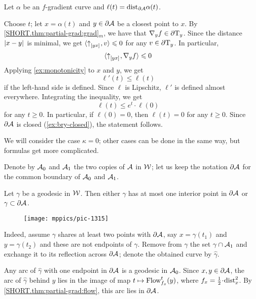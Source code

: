 Let $\alpha$ be an $f$-gradient curve and $\ell(t)=\mathrm{dist}_{\partial \mathcal{A}}\alpha(t)$.

Choose $t$;
let $x=\alpha(t)$ and $y\in \partial\mathcal{A}$ be a closest point to $x$.
By \ref{SHORT.thm:partial-grad:grad}$_m$, we have that $\nabla_y f\in\partial \mathrm{T}_y$.
Since the distance $|{x}-{y}|_{}^{{}}$ is minimal, 
we get $\langle {\uparrow}_{[{y}{x}]_{{}}},v\rangle\leqslant 0$ for any $v\in \partial \mathrm{T}_y$.
In particular,
\[\langle {\uparrow}_{[{y}{x}]_{{}}},\nabla_y f\rangle\leqslant 0\]
Applying \ref{ex:monotonicity} to $x$ and $y$,
we get
\[\ell'(t)\le \ell(t)\]
if the left-hand side is defined.
Since $\ell$ is Lipschitz, $\ell'$ is defined almost everywhere.
Integrating the inequality, we get 
\[\ell(t)\le e^t\cdot\ell(0)\]
for any $t\ge 0$.
In particular, if $\ell(0)=0$, then $\ell(t)=0$ for any $t\ge 0$.
Since $\partial\mathcal{A}$ is closed (\ref{ex:bry-closed}), the statement follows.

We will consider the case $\kappa=0$;
other cases can be done in the same way, but formulas get more complicated.

Denote by $\mathcal{A}_0$ and $\mathcal{A}_1$ the two copies of $\mathcal{A}$ in $\mathcal{W}$;
let us keep the notation $\partial \mathcal{A}$ for the common boundary of $\mathcal{A}_0$ and $\mathcal{A}_1$.

\begin{clm}{}
Let $\gamma$ be a geodesic in $\mathcal{W}$.
Then either $\gamma$ has at most one interior point in $\partial \mathcal{A}$ or
$\gamma\subset \partial \mathcal{A}$.
\end{clm}

\begin{wrapfigure}{r}{45mm}
\vskip-2mm
\centering
\texttt{[image: mppics/pic-1315]}
\end{wrapfigure}

Indeed, assume $\gamma$ shares at least two points with $\partial \mathcal{A}$, say $x=\gamma(t_1)$ and $y=\gamma(t_2)$ and these are not endpoints of $\gamma$.
Remove from $\gamma$ the set $\gamma\cap \mathcal{A}_1$
and exchange it to its reflection across $\partial\mathcal{A}$;
denote the obtained curve by $\hat\gamma$.

Any arc of $\hat\gamma$ with one endpoint in $\partial \mathcal{A}$
is a geodesic in $\mathcal{A}_0$.
Since $x,y\in \partial \mathcal{A}$, the arc of $\hat\gamma$ behind $y$ lies in the image of map $t\mapsto \mathop{\rm Flow}\nolimits^t_{f_x}(y)$, where $f_x=\tfrac12\cdot\distfun^2_x$.
By \ref{SHORT.thm:partial-grad:flow}, this arc lies in $\partial\mathcal{A}$.

